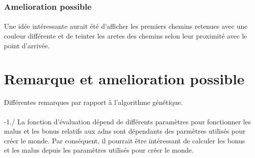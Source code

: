 \documentclass{article}
\begin{document}


  \subsubsection{Amelioration possible} %
  \label{ssub:Amelioration possible}
    \paragraph{} %
    \label{par:}
      Une idée intéressante aurait été d'afficher les premiers chemins retenues
      avec une couleur différente et de teinter les aretes des chemins selon
      leur proximité avec le point d'arrivée.


\section{Remarque et amelioration possible} %
\label{sec:Remarque et amelioration possible}


        Différentes remarques par rapport à l'algorithme génétique.
        
        \paragraph{} %
        \label{par:}
        
        -1./ La fonction d'évaluation dépend de différents paramètres pour
        fonctionner les malus et les bonus relatifs aux adns sont dépendants des
        parmètres utilisés pour créer le monde. Par conséquent, il pourrait être
        intéressant de calculer les bonus et les malus depuis les paramètres
        utilisés pour créer le monde.
        
        \paragraph{} %
        \label{par:}
        
\end{document}
